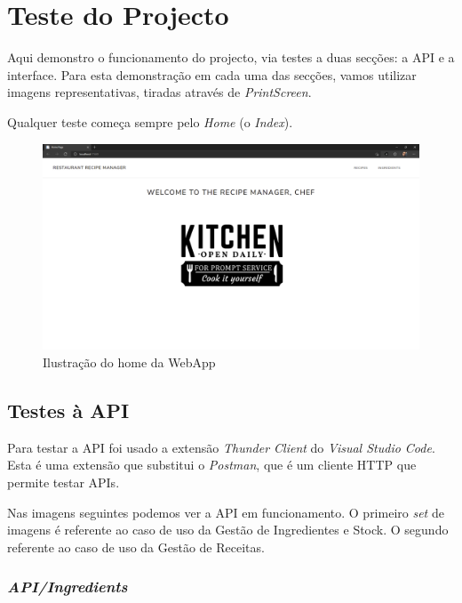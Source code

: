\chapter{Teste do Projecto}

Aqui demonstro o funcionamento do projecto, via testes a duas secções: a API e a interface. Para esta demonstração em cada uma das secções, vamos utilizar imagens representativas, tiradas através de \textit{PrintScreen}.

Qualquer teste começa sempre pelo \textit{Home} (o \textit{Index}).

\begin{figure}[!hbt]
    \centering
    \includegraphics[width=14cm]{Resources/WebApp/Home/home.png}
    \caption{Ilustração do home da WebApp}
    
\end{figure}
\FloatBarrier

\section{Testes à API}

Para testar a API foi usado a extensão \textit{Thunder Client} do \textit{Visual Studio Code}. Esta é uma extensão que substitui o \textit{Postman}, que é um cliente HTTP que permite testar APIs.

Nas imagens seguintes podemos ver a API em funcionamento. O primeiro \textit{set} de imagens é referente ao caso de uso da Gestão de Ingredientes e Stock. O segundo referente ao caso de uso da Gestão de Receitas.

\newpage
\subsection{\textit{API/Ingredients}}

